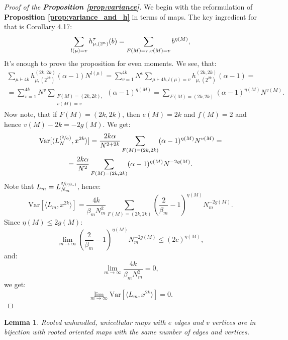 \documentclass{article}
\newtheorem{lemma}{Lemma}
\newcommand{\Var}{\mathrm{Var}}
\begin{document}
\begin{proof}[Proof of the \textbf{Proposition \ref{prop:variance}}]
    We begin with the reformulation of \textbf{Proposition \ref{prop:variance_and_h}} in terms of maps. The key ingredient for that is 		\cite{lacroix} Corollary 4.17:
	$$
		\sum\limits_{l(\mu) = v}h_{\mu, (2^n)}^{\tau}(b) = \sum\limits_{F(M) = \tau, \\ v(M) = v}b^{\eta(M)},
	$$
    It's enough to prove the proposition for even moments. We see, that:
    \begin{multline}
        \sum\limits_{\mu \vdash 4k}h_{\mu, (2^{2k})}^{(2k, 2k)}(\alpha - 1)N^{l(\mu)} = \sum\limits_{v = 1}^{4k}N^{v}\sum\limits_{\mu \vdash 4k, l(\mu) = v}h_{\mu, (2^{2k})}^{(2k, 2k)}(\alpha - 1) = \\
        = \sum\limits_{v = 1}^{4k}N^v\sum\limits_{\substack{F(M) = (2k, 2k), \\ v(M) = v}}(\alpha - 1)^{\eta(M)} = \sum\limits_{F(M)=(2k,2k)}(\alpha - 1)^{\eta(M)}N^{v(M)}.
    \end{multline}
    Now note, that if $F(M) = (2k, 2k)$, then $e(M) = 2k$ and $f(M) = 2$ and hence $v(M) - 2k = -2g(M)$. We get: 
    \begin{multline}
        \Var[\langle L_{N}^{(\sfrac{2}{\alpha})}, x^{2k} \rangle] = \frac{2k\alpha}{N^{2 + 2k}}\sum\limits_{F(M)=(2k,2k)}(\alpha - 1)^{\eta(M)}N^{v(M)} = \\
        = \frac{2k\alpha}{N^2}\sum\limits_{F(M)=(2k,2k)}(\alpha - 1)^{\eta(M)}N^{-2g(M)}.
    \end{multline}
    Note that $L_m = L_{N_m}^{\sfrac{2}{(\sfrac{2}{\beta_m})}}$, hence:
    $$
        \Var[\langle L_{m}, x^{2k} \rangle] = \frac{4k}{\beta_ mN_m^2}\sum\limits_{F(M)=(2k,2k)}\left(\frac{2}{\beta_m} - 1\right)^{\eta(M)}N_m^{-2g(M)}.
    $$
    Since $\eta(M) \leq 2g(M)$:
    $$
        \lim\limits_{m \to \infty}\left(\frac{2}{\beta_m} - 1\right)^{\eta(M)}N_m^{-2g(M)} \leq (2c)^{\eta(M)},
    $$
    and:
    $$
        \lim\limits_{m \to \infty}\frac{4k}{\beta_ mN_m^2} = 0,
    $$
    we get:
    $$
        \lim\limits_{m \to \infty}\Var[\langle L_{m}, x^{2k} \rangle] = 0.
    $$
    
\end{proof}

\begin{lemma} \label{lemma:unhandled_to_oriented_bijection}
    Rooted unhandled, unicellular maps with $e$ edges and $v$ vertices are in bijection with rooted oriented maps with the same number of edges and vertices.
\end{lemma}
\end{document}
